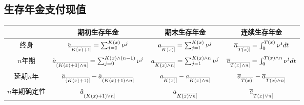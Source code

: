 \documentclass[lang=cn,10pt]{elegantbook}
\makeatletter
\DeclareRobustCommand{\annu}[1]{_{%
    \def\arraystretch{0}%
    \setlength\arraycolsep{1pt}%
    \setlength\arrayrulewidth{.2pt}%
    \begin{array}[b]{@{}c|}\hline
        \\[\arraycolsep]%
        \scriptstyle #1%
    \end{array}%
}}
\makeatother
\begin{document}
\subsection{生存年金支付现值}
\begin{center}
    \begin{tabular}{c|c|c|c}
        \hline
                      & 期初生存年金                                                             & 期末生存年金                                               & 连续生存年金                                                       \\
        \hline
        终身          & $\ddot a_{\annu{K(x)+1}} = \sum_{j=0}^{K(x)}{\nu^j}$                     & $a_{\annu{K(x)}} = \sum_{j=1}^{K(x)}{\nu^j}$               & $\overline{a}_{\annu{T(x)}}=\int_0^{T(x)} \nu^tdt$                 \\
        \hline
        $n$年期       & $\ddot a_{\annu{(K(x)+1)\land n}} = \sum_{j=0}^{K(x)\land (n-1)}{\nu^j}$ & $a_{\annu{K(x)\land n}} = \sum_{j=1}^{K(x)\land n}{\nu^j}$ & $  \overline{a}_{\annu{T(x)\land n}}=\int_0^{T(x)\land n} \nu^tdt$ \\
        \hline
        延期$n$年     & $\ddot a_{\annu{(K(x)+1)}} - \ddot a_{\annu{(K(x)+1)\land n}}$           & $a_{\annu{K(x)}} - a_{\annu{K(x)\land n}}$                 & $\overline{a}_{\annu{T(x)}} - \overline{a}_{\annu{T(x)\land n}}$   \\
        \hline
        $n$年期确定性 & $\ddot a_{\annu{(K(x)+1)\lor n}}$                                        & $a_{\annu{K(x)\lor n}}$                                    & $\overline{a}_{\annu{T(x)\lor n}}$                                 \\
        \hline
    \end{tabular}
\end{center}
\end{document}
